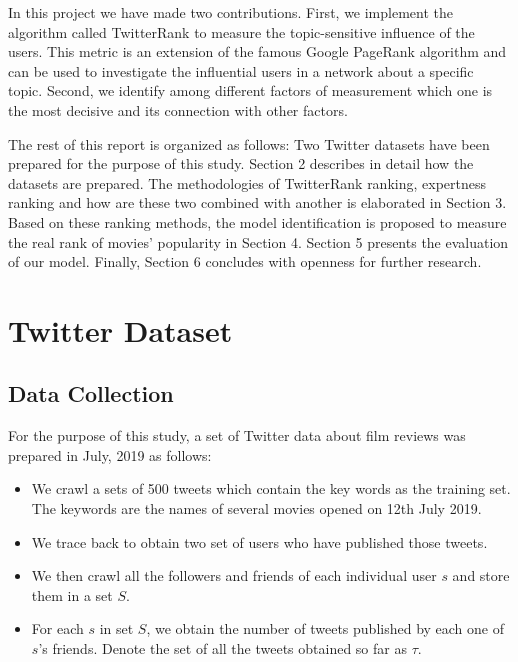 \documentclass[conference]{IEEEtran}
\theoremstyle{definition}
\begin{document}
In this project we have made two contributions. First, we implement the algorithm called TwitterRank to measure the topic-sensitive influence of the \textup{users}. This metric is an extension of the famous Google PageRank algorithm and can be used to investigate the influential users in a network about a specific topic. Second, we identify among different factors of measurement which one is the most decisive and its connection with other factors. 

The rest of this report is organized as follows: Two \textup{Twitter} datasets
have been prepared for the purpose of this study. Section 2 describes in detail how the datasets are prepared. The methodologies of TwitterRank ranking, expertness ranking and how are these two combined with another is elaborated in Section 3. Based on these ranking methods, the model identification is proposed to measure the real rank of movies' popularity in Section 4. Section 5 presents the evaluation of our model. Finally, Section 6 concludes with openness for further research. 



\section{Twitter Dataset}
\subsection{Data Collection}
For the purpose of this study, a set of Twitter data about film reviews was prepared in July, 2019 as follows:

\begin{itemize}
	\item We crawl a sets of 500 \textup{tweets} which contain the key words as the training set. The keywords are the names of several movies opened on 12th July 2019.
	
	\item We trace back to obtain two set of users who have published those \textup{tweets}.
	
	\item We then crawl all the \textup{followers} and \textup{friends} of each individual \textup{user} $s$ and store them in a set $S$.
	
	\item For each $s$ in set $S$, we obtain the number of \textup{tweets} published by each one of $s$'s friends. Denote the set of all the tweets obtained so far as $\tau$.
\end{itemize}
\end{document}

